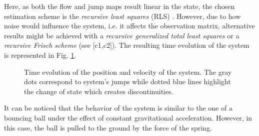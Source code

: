 Here, as both the flow and jump maps result linear in the state, the chosen estimation scheme is the \textit{recursive least squares} (RLS) \cite{ljung1987system}. However, due to how noise would influence the system, i.e. it affects the observation matrix, alternative results might be achieved with a \textit{recursive generalized total least squares} \citep{RHODE20144637} or a \textit{recursive Frisch scheme} (see [c1,c2]). The resulting time evolution of the system is represented in Fig. \ref{fig:trj}. 
\begin{figure}[!ht]
	\centering
    
	\caption[Time evolution of the position and velocity of the system.]{Time evolution of the position and velocity of the system. The gray dots correspond to system's jumps while dotted blue lines highlight the change of state which creates discontinuities.}
	\label{fig:trj}
\end{figure}
%
%
%
It can be noticed that the behavior of the system is similar to the one of a bouncing ball under the effect of constant gravitational acceleration. However, in this case, the ball is pulled to the ground by the force of the spring.

